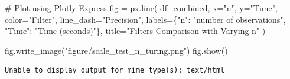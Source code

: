 \documentclass[
]{report}
\newenvironment{Shaded}{\begin{snugshade}}{\end{snugshade}}
\newcommand{\CommentTok}[1]{\textcolor[rgb]{0.37,0.37,0.37}{#1}}
\newcommand{\NormalTok}[1]{\textcolor[rgb]{0.00,0.23,0.31}{#1}}
\newcommand{\OperatorTok}[1]{\textcolor[rgb]{0.37,0.37,0.37}{#1}}
\newcommand{\StringTok}[1]{\textcolor[rgb]{0.13,0.47,0.30}{#1}}
\begin{document}
\begin{Shaded}
\begin{Highlighting}[]
\CommentTok{\# Plot using Plotly Express}
\NormalTok{fig }\OperatorTok{=}\NormalTok{ px.line(}
\NormalTok{    df\_combined,}
\NormalTok{    x}\OperatorTok{=}\StringTok{"n"}\NormalTok{,}
\NormalTok{    y}\OperatorTok{=}\StringTok{"Time"}\NormalTok{,}
\NormalTok{    color}\OperatorTok{=}\StringTok{"Filter"}\NormalTok{,}
\NormalTok{    line\_dash}\OperatorTok{=}\StringTok{"Precision"}\NormalTok{,}
\NormalTok{    labels}\OperatorTok{=}\NormalTok{\{}\StringTok{"n"}\NormalTok{: }\StringTok{"number of observations"}\NormalTok{, }\StringTok{"Time"}\NormalTok{: }\StringTok{"Time (seconds)"}\NormalTok{\},}
\NormalTok{    title}\OperatorTok{=}\StringTok{"Filters Comparison with Varying n"}
\NormalTok{)}

\NormalTok{fig.write\_image(}\StringTok{"figure/scale\_test\_n\_turing.png"}\NormalTok{)}
\NormalTok{fig.show()}
\end{Highlighting}
\end{Shaded}

\begin{verbatim}
Unable to display output for mime type(s): text/html
\end{verbatim}
\end{document}
